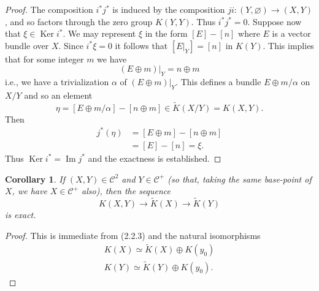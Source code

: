 \documentclass[leqno]{book}
\numberwithin{equation}{section}
\newtheorem{corollary}[theorem]{Corollary}
\theoremstyle{definition}
\begin{document}
            \begin{proof}
              The composition $i^{*}j^{*}$ is induced by the composition $ji:(Y,\varnothing)\to (X,Y)$, and so factors through the zero group $K(Y,Y)$. Thus $i^{*}j^{*}=0$. Suppose now that $\xi \in \operatorname{Ker} i^{*}$. We may represent $\xi$ in the form $[E]-[n]$ where $E$ is a vector bundle over $X$. Since $i^{*}\xi=0$ it follows that $[E|_{Y}]=[n]$ in $K(Y)$. This implies that for some integer $m$ we have
              \begin{equation*}
                (E\oplus m)|_{Y}=n\oplus m
              \end{equation*}
              i.e., we have a trivialization $\alpha$ of $(E\oplus m)|_{Y}$. This defines a bundle $E\oplus m/\alpha$ on $X/Y$ and so an element
              \begin{equation*}
                \eta=[E\oplus m/\alpha]-[n\oplus m] \in \tilde{K}(X/Y)=K(X,Y).
              \end{equation*}
              Then
              \begin{equation*}
                \begin{aligned}
                  j^{*}(\eta)&=[E\oplus m]-[n\oplus m] \\
                  &=[E]-[n]=\xi.
                \end{aligned}
              \end{equation*}
              Thus $\operatorname{Ker} i^{*}=\operatorname{Im} j^{*}$ and the exactness is established.
            \end{proof}

            \begin{corollary}
              If $(X,Y)\in \mathcal{C}^{2}$ and $Y \in \mathcal{C}^{+}$ (so that, taking the same base-point of $X$, we have $X \in \mathcal{C}^{+}$ also), then the sequence
              \begin{equation*}
                K(X,Y)\to \tilde{K}(X)\to \tilde{K}(Y)
              \end{equation*}
              is exact.
            \end{corollary}

            \begin{proof}
              This is immediate from (2.2.3) and the natural isomorphisms
              \begin{equation*}
                \begin{aligned}
                K(X) \simeq \tilde{K}(X)\oplus K(y_0) \\
                K(Y)\simeq \tilde{K}(Y)\oplus K(y_0).
                \end{aligned}
              \end{equation*}
            \end{proof}
            
\end{document}
